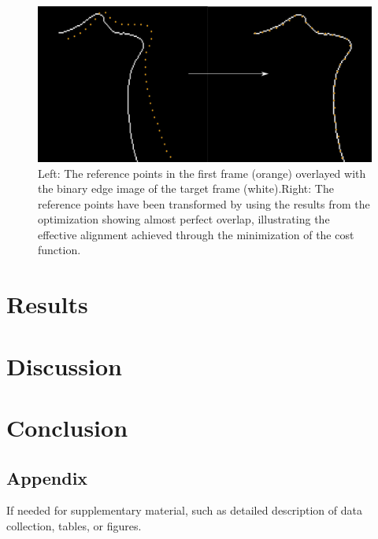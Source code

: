 \documentclass{micro-econ-thesis}
\begin{document}
\begin{figure}[H]
	\centering
	\includegraphics[width=0.7\linewidth]{image137}
	\caption{Left: The reference points in the first frame (orange) overlayed with the binary edge image of the target frame (white).Right: The reference points have been transformed by using the results from the optimization showing almost perfect overlap, illustrating the effective alignment achieved through the minimization of the cost function.}
	\label{fig:image137}
\end{figure}


\section{Results}
\label{sec:yetanother}

\section{Discussion}

 

\section{Conclusion}


\cleardoublepage
{}
{} %
\printbibliography

\cleardoublepage
\begin{appendix}
\section{Appendix}
If needed for supplementary material, such as detailed description of data collection, tables, or figures.

\end{appendix}

\makeThesisDeclaration
\end{document}
